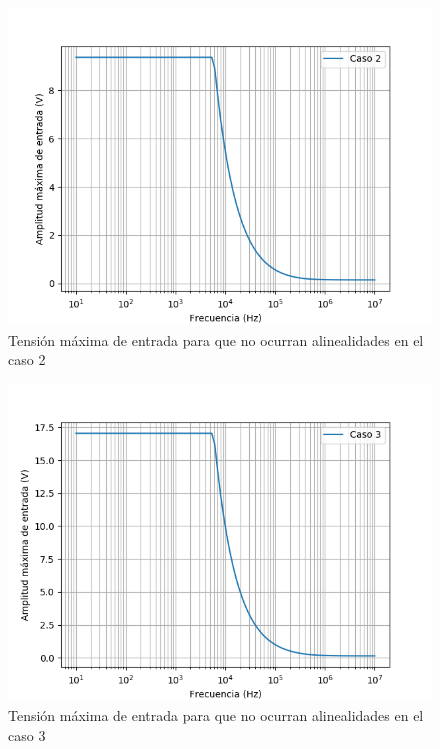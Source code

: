 \begin{figure}[H]
\begin{centering}
\includegraphics[scale=0.5]{../Ex1/iB/Resources1b/AmplMaxVsFreq2}
\par\end{centering}
\caption{Tensión máxima de entrada para que no ocurran alinealidades en el
caso 2}
\label{1_b_28}
\end{figure}

\begin{figure}[H]
\begin{centering}
\includegraphics[scale=0.5]{../Ex1/iB/Resources1b/AmplMaxVsFreq3}
\par\end{centering}
\caption{Tensión máxima de entrada para que no ocurran alinealidades en el
caso 3}
\label{1_b_29}
\end{figure}

